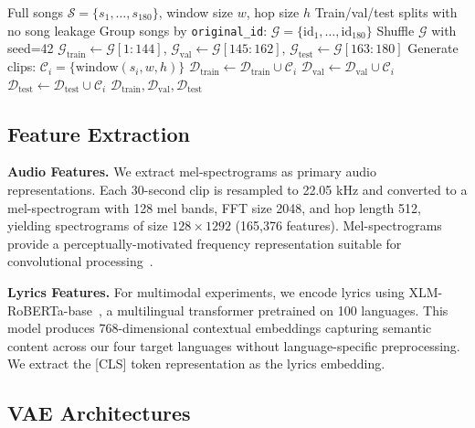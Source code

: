\documentclass[10pt,twocolumn]{article}
\begin{document}
\begin{algorithm}[t]
\caption{Song-Level Dataset Splitting for Windowed Data}
\label{alg:song_split}
\begin{algorithmic}[1]
\REQUIRE Full songs $\mathcal{S} = \{s_1, \ldots, s_{180}\}$, window size $w$, hop size $h$
\ENSURE Train/val/test splits with no song leakage
\STATE Group songs by \texttt{original\_id}: $\mathcal{G} = \{\text{id}_1, \ldots, \text{id}_{180}\}$
\STATE Shuffle $\mathcal{G}$ with seed=42
\STATE $\mathcal{G}_{\text{train}} \gets \mathcal{G}[1:144]$, $\mathcal{G}_{\text{val}} \gets \mathcal{G}[145:162]$, $\mathcal{G}_{\text{test}} \gets \mathcal{G}[163:180]$
    \STATE Generate clips: $\mathcal{C}_i = \{\text{window}(s_i, w, h)\}$
        \STATE $\mathcal{D}_{\text{train}} \gets \mathcal{D}_{\text{train}} \cup \mathcal{C}_i$
        \STATE $\mathcal{D}_{\text{val}} \gets \mathcal{D}_{\text{val}} \cup \mathcal{C}_i$
    \ELSE
        \STATE $\mathcal{D}_{\text{test}} \gets \mathcal{D}_{\text{test}} \cup \mathcal{C}_i$
    \ENDIF
\ENDFOR
\RETURN $\mathcal{D}_{\text{train}}, \mathcal{D}_{\text{val}}, \mathcal{D}_{\text{test}}$
\end{algorithmic}
\end{algorithm}

\subsection{Feature Extraction}

\textbf{Audio Features.} We extract mel-spectrograms as primary audio representations. Each 30-second clip is resampled to 22.05 kHz and converted to a mel-spectrogram with 128 mel bands, FFT size 2048, and hop length 512, yielding spectrograms of size $128 \times 1292$ (165,376 features). Mel-spectrograms provide a perceptually-motivated frequency representation suitable for convolutional processing~\cite{cramer2019openl3}.

\textbf{Lyrics Features.} For multimodal experiments, we encode lyrics using XLM-RoBERTa-base~\cite{conneau2019xlm}, a multilingual transformer pretrained on 100 languages. This model produces 768-dimensional contextual embeddings capturing semantic content across our four target languages without language-specific preprocessing. We extract the [CLS] token representation as the lyrics embedding.

\subsection{VAE Architectures}
\end{document}
